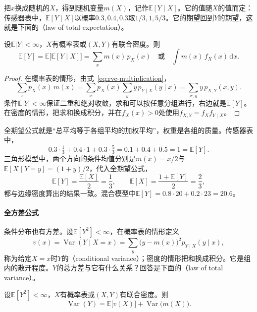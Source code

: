 把$x$换成随机的$X$，得到随机变量$m(X)$，记作$\mathbb{E}[Y\mid X]$。它的值随$X$的值而定：传感器表中，$\mathbb{E}[Y\mid X]$以概率$0.3,0.4,0.3$取$1/3,1,5/3$。它的期望回到$Y$的期望，这就是下面的（law of total expectation）。

\begin{theorem}[全期望公式]
\label{thm:rvc-total-expectation}
设$\mathbb{E}\lvert Y\rvert<\infty$，$X$有概率表或$(X,Y)$有联合密度。则
\begin{equation}
 \mathbb{E}[Y]=\mathbb{E}\bigl[\mathbb{E}[Y\mid X]\bigr]=\sum_{x}m(x)\,p_X(x)\quad\text{或}\quad\int m(x)\,f_X(x)\,\mathrm{d}x .
 \label{eq:rvc-total-expectation}
\end{equation}
\end{theorem}

\begin{proof}
在概率表的情形，由式~\eqref{eq:rvc-multiplication}，
\[
 \sum_{x}p_X(x)\,m(x)=\sum_{x}p_X(x)\sum_{y}y\,p_{Y\mid X}(y\mid x)=\sum_{x,y}y\,p_{X,Y}(x,y).
\]
条件$\mathbb{E}\lvert Y\rvert<\infty$保证二重和绝对收敛，求和可以按任意分组进行，右边就是$\mathbb{E}[Y]$。在密度的情形，把求和换成积分，并在$f_X(x)>0$处使用$f_{X,Y}=f_Xf_{Y\mid X}$。
\end{proof}

全期望公式就是“总平均等于各组平均的加权平均”，权重是各组的质量。传感器表中，
\[
 0.3\cdot\tfrac13+0.4\cdot1+0.3\cdot\tfrac53=0.1+0.4+0.5=1=\mathbb{E}[Y].
\]
三角形模型中，两个方向的条件均值分别是$m(x)=x/2$与$\mathbb{E}[X\mid Y=y]=(1+y)/2$，代入全期望公式，
\[
 \mathbb{E}[Y]=\frac{\mathbb{E}[X]}{2}=\frac13,\qquad \mathbb{E}[X]=\frac{1+\mathbb{E}[Y]}{2}=\frac23,
\]
都与边缘密度算出的结果一致。混合模型中$\mathbb{E}[Y]=0.8\cdot20+0.2\cdot23=20.6$。

\paragraph{全方差公式}
条件分布也有方差。设$\mathbb{E}[Y^{2}]<\infty$，在概率表的情形定义
\begin{equation}
 v(x)=\operatorname{Var}(Y\mid X=x)=\sum_{y}\bigl(y-m(x)\bigr)^{2}p_{Y\mid X}(y\mid x),
 \label{eq:rvc-conditional-variance}
\end{equation}
称为给定$X=x$时$Y$的（conditional variance）；密度的情形把和换成积分。它是组内的散开程度。$Y$的总方差与它有什么关系？回答是下面的（law of total variance）。

\begin{theorem}[全方差公式]
\label{thm:rvc-total-variance}
设$\mathbb{E}[Y^{2}]<\infty$，$X$有概率表或$(X,Y)$有联合密度。则
\begin{equation}
 \operatorname{Var}(Y)=\mathbb{E}\bigl[v(X)\bigr]+\operatorname{Var}\bigl(m(X)\bigr).
 \label{eq:rvc-total-variance}
\end{equation}
\end{theorem}


